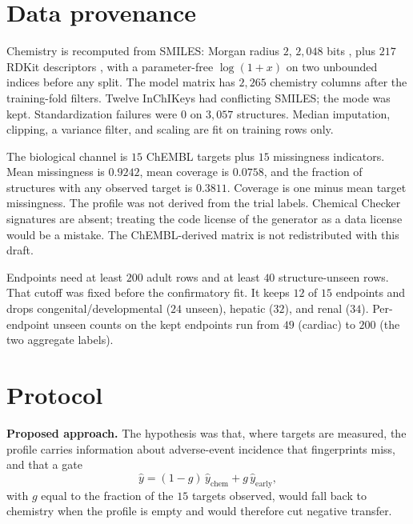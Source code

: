 \documentclass{article}
\begin{document}
\section{Data provenance}
\label{sec:data}

Chemistry is recomputed from SMILES: Morgan radius $2$, $2{,}048$ bits \citep{rogers2010ecfp}, plus $217$ RDKit descriptors \citep{rdkit}, with a parameter-free $\log(1+x)$ on two unbounded indices before any split.
The model matrix has $2{,}265$ chemistry columns after the training-fold filters.
Twelve InChIKeys had conflicting SMILES; the mode was kept.
Standardization failures were $0$ on $3{,}057$ structures.
Median imputation, clipping, a variance filter, and scaling are fit on training rows only.

The biological channel is $15$ ChEMBL targets plus $15$ missingness indicators.
Mean missingness is $0.9242$, mean coverage is $0.0758$, and the fraction of structures with any observed target is $0.3811$.
Coverage is one minus mean target missingness.
The profile was not derived from the trial labels.
Chemical Checker signatures are absent; treating the code license of the generator as a data license would be a mistake.
The ChEMBL-derived matrix is not redistributed with this draft.

Endpoints need at least $200$ adult rows and at least $40$ structure-unseen rows.
That cutoff was fixed before the confirmatory fit.
It keeps $12$ of $15$ endpoints and drops congenital/developmental ($24$ unseen), hepatic ($32$), and renal ($34$).
Per-endpoint unseen counts on the kept endpoints run from $49$ (cardiac) to $200$ (the two aggregate labels).

\section{Protocol}
\label{sec:protocol}

\textbf{Proposed approach.}
The hypothesis was that, where targets are measured, the profile carries information about adverse-event incidence that fingerprints miss, and that a gate
\[
\hat y = (1-g)\,\hat y_{\mathrm{chem}} + g\,\hat y_{\mathrm{early}},
\]
with $g$ equal to the fraction of the $15$ targets observed, would fall back to chemistry when the profile is empty and would therefore cut negative transfer.
\end{document}
